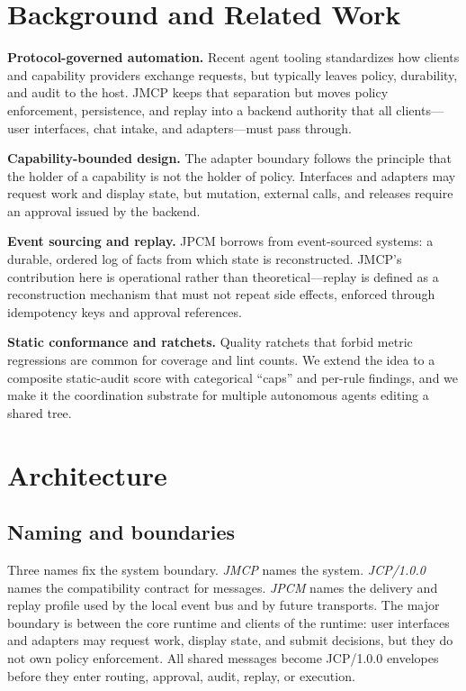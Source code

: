 \documentclass[conference]{IEEEtran}
\begin{document}
\section{Background and Related Work}

\textbf{Protocol-governed automation.} Recent agent tooling standardizes how
clients and capability providers exchange requests, but typically leaves
policy, durability, and audit to the host. JMCP keeps that separation but moves
policy enforcement, persistence, and replay into a backend authority that all
clients---user interfaces, chat intake, and adapters---must pass through.

\textbf{Capability-bounded design.} The adapter boundary follows the principle
that the holder of a capability is not the holder of policy. Interfaces and
adapters may request work and display state, but mutation, external calls, and
releases require an approval issued by the backend.

\textbf{Event sourcing and replay.} JPCM borrows from event-sourced systems: a
durable, ordered log of facts from which state is reconstructed. JMCP's
contribution here is operational rather than theoretical---replay is defined as
a reconstruction mechanism that must not repeat side effects, enforced through
idempotency keys and approval references.

\textbf{Static conformance and ratchets.} Quality ratchets that forbid metric
regressions are common for coverage and lint counts. We extend the idea to a
composite static-audit score with categorical ``caps'' and per-rule findings,
and we make it the coordination substrate for multiple autonomous agents
editing a shared tree.

\section{Architecture}
\label{sec:arch}

\subsection{Naming and boundaries}
Three names fix the system boundary. \emph{JMCP} names the system. \emph{JCP/1.0.0}
names the compatibility contract for messages. \emph{JPCM} names the delivery
and replay profile used by the local event bus and by future transports. The
major boundary is between the core runtime and clients of the runtime: user
interfaces and adapters may request work, display state, and submit decisions,
but they do not own policy enforcement. All shared messages become JCP/1.0.0
envelopes before they enter routing, approval, audit, replay, or execution.
\end{document}

